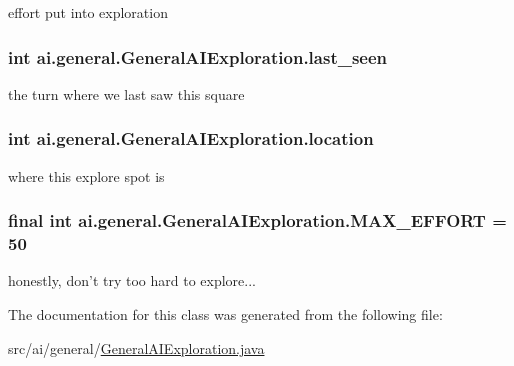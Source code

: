 \label{classai_1_1general_1_1_general_a_i_exploration_a8e960c790a7b8d63841a7e2eedea9f85}
effort put into exploration \hypertarget{classai_1_1general_1_1_general_a_i_exploration_a8cc7f9509b921afbcf4ede4964476316}{
\subsubsection[{last\_\-seen}]{\setlength{\rightskip}{0pt plus 5cm}int {\bf ai.general.GeneralAIExploration.last\_\-seen}}}
\label{classai_1_1general_1_1_general_a_i_exploration_a8cc7f9509b921afbcf4ede4964476316}
the turn where we last saw this square \hypertarget{classai_1_1general_1_1_general_a_i_exploration_a05b90a2f5718f73880624f2013c1bb05}{
\subsubsection[{location}]{\setlength{\rightskip}{0pt plus 5cm}int {\bf ai.general.GeneralAIExploration.location}}}
\label{classai_1_1general_1_1_general_a_i_exploration_a05b90a2f5718f73880624f2013c1bb05}
where this explore spot is \hypertarget{classai_1_1general_1_1_general_a_i_exploration_a20679f76ebc301269b9426537cbc4dc7}{
\subsubsection[{MAX\_\-EFFORT}]{\setlength{\rightskip}{0pt plus 5cm}final int {\bf ai.general.GeneralAIExploration.MAX\_\-EFFORT} = 50}}
\label{classai_1_1general_1_1_general_a_i_exploration_a20679f76ebc301269b9426537cbc4dc7}
honestly, don't try too hard to explore... 

The documentation for this class was generated from the following file:\begin{DoxyCompactItemize}
\item 
src/ai/general/\hyperlink{_general_a_i_exploration_8java}{GeneralAIExploration.java}\end{DoxyCompactItemize}

